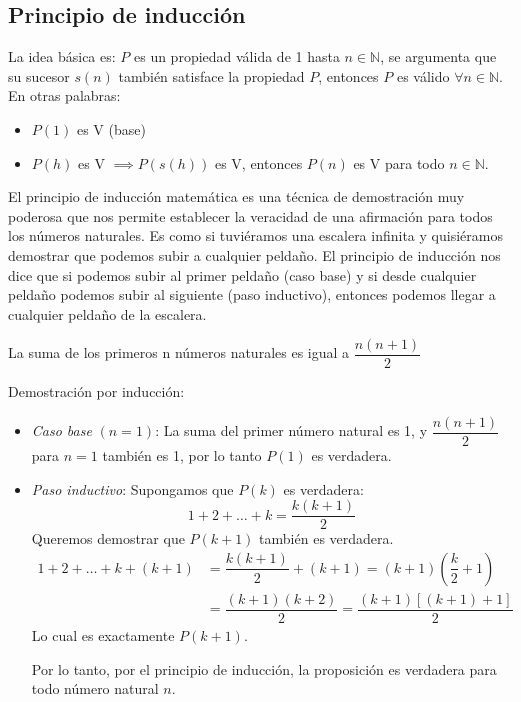 \subsection{Principio de inducción} \label{sec:induccion}  
La idea básica es: $P$ es un propiedad válida de 1 hasta $n \in \mathbb{N}$, se argumenta que su sucesor $s(n)$ también satisface la propiedad $P$, entonces $P$ es válido $\forall n \in \mathbb{N}$. En otras palabras:

\begin{itemize}
	\item $P(1)$ es V (base)
	\item $P(h)$ es V $\implies P(s(h))$ es V, entonces $P(n)$ es V para todo $n \in \mathbb{N}$.
\end{itemize}

El principio de inducción matemática es una técnica de demostración muy poderosa que nos permite establecer la veracidad de una afirmación para todos los números naturales. Es como si tuviéramos una escalera infinita y quisiéramos demostrar que podemos subir a cualquier peldaño. El principio de inducción nos dice que si podemos subir al primer peldaño (caso base) y si desde cualquier peldaño podemos subir al siguiente (paso inductivo), entonces podemos llegar a cualquier peldaño de la escalera.

\begin{fmd-example}
	La suma de los primeros n números naturales es igual a \( \dfrac{n(n+1)}{2} \)
	
	Demostración por inducción:
	
	\begin{itemize}
		\item \textit{Caso base} $(n=1)$: La suma del primer número natural es 1, y \( \dfrac{n(n+1)}{2} \) para $n = 1$ también es 1, por lo tanto $P(1)$ es verdadera.
		
		\item \textit{Paso inductivo}: Supongamos que $P(k)$ es verdadera:
		\[ 1 + 2 + \dots + k = \dfrac{k(k+1)}{2} \]
		Queremos demostrar que $P(k+1)$ también es verdadera.
		\[ \begin{split}
			1 + 2 + \dots + k + (k+1) &= \dfrac{k(k+1)}{2}  + (k+1) = (k+1) \left(\dfrac{k}{2} + 1\right) \\ &= \dfrac{(k+1)(k+2)}{2} = \dfrac{(k+1)\left[ (k+1) + 1 \right]}{2}
		\end{split} \]
		Lo cual es exactamente $P(k+1)$.
		
		Por lo tanto, por el principio de inducción, la proposición es verdadera para todo número natural $n$.
	\end{itemize}
\end{fmd-example}

